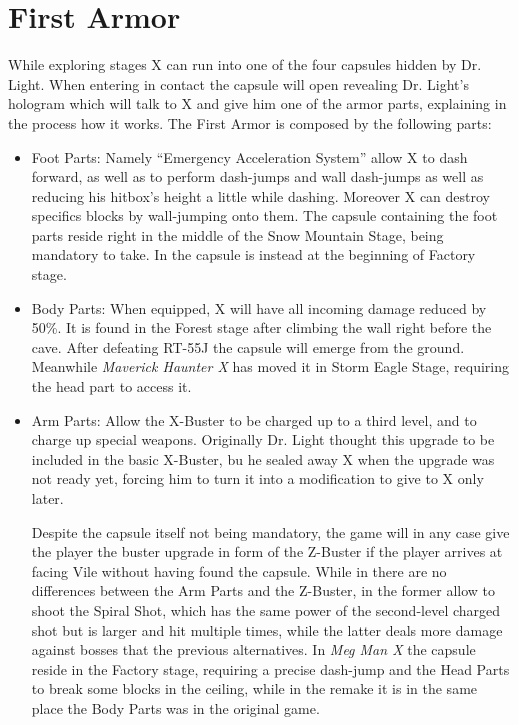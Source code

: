 \section{First Armor}\label{X1:Armor}
While exploring stages X can run into one of the four capsules hidden by Dr. Light. When entering in contact the capsule will open revealing Dr. Light's hologram which will talk to X and give him one of the armor parts\cite{wiki:First_armor}, explaining in the process how it works.
The First Armor is composed by the following parts:
\begin{itemize}
	\item Foot Parts: Namely ``Emergency Acceleration System''\cite{X:Manual} allow X to dash forward, as well as to perform dash-jumps and wall dash-jumps as well as reducing his hitbox's height a little while dashing. Moreover X can destroy specifics blocks by wall-jumping onto them. The capsule containing the foot parts reside right in the middle of the Snow Mountain Stage, being mandatory to take. In \mhx the capsule is instead at the beginning of Factory stage.
	
	\item Body Parts: When equipped, X will have all incoming damage reduced by 50\%. It is found in the Forest stage after climbing the wall right before the cave. After defeating RT-55J the capsule will emerge from the ground. Meanwhile \textit{Maverick Haunter X} has moved it in Storm Eagle Stage, requiring the head part to access it.
	
	\item Arm Parts: Allow the X-Buster to be charged up to a third level, and to charge up special weapons. Originally Dr. Light thought this upgrade to be included in the basic X-Buster\cite{X:Manual}, bu he sealed away X when the upgrade was not ready yet, forcing him to turn it into a modification to give to X only later.
	
	Despite the capsule itself not being mandatory, the game will in any case give the player the buster upgrade in form of the Z-Buster if the player arrives at facing Vile without having found the capsule. While in \x there are no differences between the Arm Parts and the Z-Buster, in \mhx the former allow to shoot the Spiral Shot, which has the same power of the second-level charged shot but is larger and hit multiple times, while the latter deals more damage against bosses that the previous alternatives. In \textit{Meg Man X} the capsule reside in the Factory stage, requiring a precise dash-jump and the Head Parts to break some blocks in the ceiling, while in the remake it is in the same place the Body Parts was in the original game.
	

\end{itemize}
